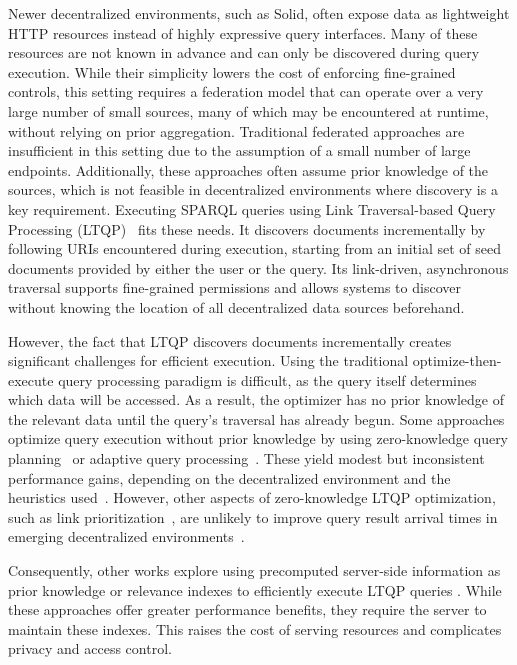 Newer decentralized environments, such as Solid, often expose data as lightweight HTTP resources instead of highly expressive query interfaces. 
Many of these resources are not known in advance and can only be discovered during query execution. 
While their simplicity lowers the cost of enforcing fine-grained controls,
this setting requires a federation model that can operate over a very large number of small sources,
many of which may be encountered at runtime, without relying on prior aggregation.
Traditional federated approaches are insufficient in this setting due to the assumption of a small number of large endpoints.
Additionally, these approaches often assume prior knowledge of the sources, which is not feasible in decentralized environments where discovery is a key requirement.
Executing SPARQL queries using Link Traversal-based Query Processing (LTQP)~\cite{hartig2009executing} fits these needs.
It discovers documents incrementally by following URIs encountered during execution, 
starting from an initial set of seed documents provided by either the user or the query.
Its link-driven, asynchronous traversal supports fine-grained permissions 
and allows systems to discover without knowing the location of all decentralized data sources beforehand.

However, the fact that LTQP discovers documents incrementally creates significant challenges for efficient execution. 
Using the traditional optimize-then-execute query processing paradigm is difficult, as the query itself determines which data will be accessed. 
As a result, the optimizer has no prior knowledge of the relevant data until the query’s traversal has already begun.
Some approaches optimize query execution without prior knowledge by using zero-knowledge query planning~\cite{hartig2011zero} or adaptive query processing~\cite{hanski2025link}. 
These yield modest but inconsistent performance gains, depending on the decentralized environment and the heuristics used~\cite{taelman2023link}.
However, other aspects of zero-knowledge LTQP optimization, such as link prioritization~\cite{hartig2016walking},
are unlikely to improve query result arrival times in emerging decentralized environments~\cite{eschauzier2025revisiting}.

Consequently, other works explore using precomputed server-side information as prior knowledge 
or relevance indexes to efficiently execute LTQP queries \newline \cite{tam2024opportunities,umbrich2011comparing,hanski2024observations}.
While these approaches offer greater performance benefits, they require the server to maintain these indexes.
This raises the cost of serving resources and complicates privacy and access control.

